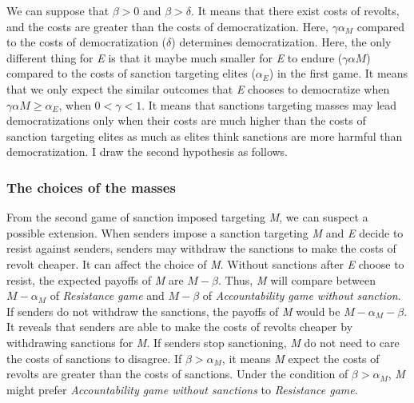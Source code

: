 \documentclass[11pt]{article}
\newtheorem{hyp}{Hypothesis}
\begin{document}
We can suppose that $\beta > 0$ and $\beta > \delta$. It means that there exist costs of revolts, and the costs are greater than the costs of democratization. Here, $\gamma\alpha_{M}$ compared to the costs of democratization ($\delta$) determines democratization. Here, the only different thing for \textit{E} is that it maybe much smaller for \textit{E} to endure ($\gamma\alpha{M}$) compared to the costs of sanction targeting elites ($\alpha_{E}$) in the first game. It means that we only expect the similar outcomes that \textit{E} chooses to democratize when $\gamma\alpha{M} \geq \alpha_{E}$, when $0 < \gamma < 1$. It means that sanctions targeting masses may  lead democratizations only when their costs are much higher than the costs of sanction targeting elites as much as elites think sanctions are more harmful than democratization. I draw the second hypothesis as follows.




	

\subsubsection*{The choices of the masses}

From the second game of sanction imposed targeting \textit{M}, we can suspect a possible extension. When senders impose a sanction targeting \textit{M} and \textit{E} decide to resist against senders, senders may withdraw the sanctions to make the costs of revolt cheaper. It can affect the choice of \textit{M}. Without sanctions after \textit{E} choose to resist, the expected payoffs of \textit{M} are $M-\beta$. Thus, \textit{M} will compare between $M-\alpha_{M}$ of \textit{Resistance game} and $M-\beta$ of \textit{Accountability game without sanction}. If senders do not withdraw the sanctions, the payoffs of \textit{M} would be $M-\alpha_{M}-\beta$. It reveals that senders are able to make the costs of revolts cheaper by withdrawing sanctions for \textit{M}. If senders stop sanctioning, \textit{M} do not need to care the costs of sanctions to disagree. If $\beta > \alpha_{M}$, it means \textit{M} expect the costs of revolts are greater than the costs of sanctions. Under the condition of $\beta  > \alpha_{M}$, \textit{M} might prefer \textit{Accountability game without sanctions} to \textit{Resistance game}.
\end{document}
